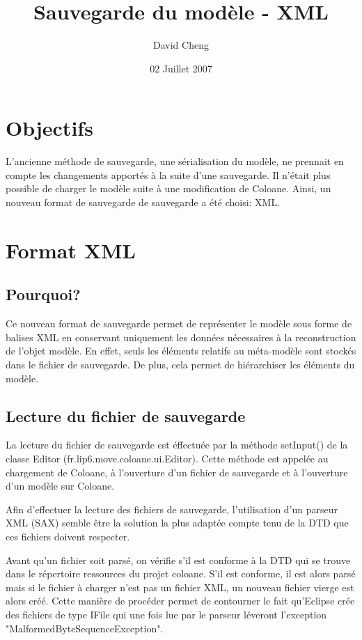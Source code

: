 \documentclass{article}
\title{Sauvegarde du mod\`ele - XML}
\author{David Cheng}
\date{02 Juillet 2007}
\begin{document}
\maketitle


\section{Objectifs}
L'ancienne m\'ethode de sauvegarde, une s\'erialisation du mod\`ele, ne prennait en compte les changements apport\'es \`a la suite d'une sauvegarde.
Il n'\'etait plus possible de charger le mod\`ele suite \`a une modification de Coloane.
Ainsi, un nouveau format de sauvegarde de sauvegarde a \'et\'e choisi: XML.
 
\section{Format XML}

\subsection{Pourquoi?}

Ce nouveau format de sauvegarde permet de repr\'esenter le mod\`ele sous forme de balises XML en conservant uniquement les donn\'ees n\'ecessaires \`a la reconstruction de l'objet mod\`ele.
En effet, seuls les \'el\'ements relatifs au m\'eta-mod\`ele sont stock\'es dans le fichier de sauvegarde.
De plus, cela permet de hi\'erarchiser les \'el\'ements du mod\`ele.
\subsection{Lecture du fichier de sauvegarde}
La lecture du fichier de sauvegarde est \'effectu\'ee par la m\'ethode setInput() de la classe Editor (fr.lip6.move.coloane.ui.Editor).
Cette m\'ethode est appel\'ee au chargement de Coloane, \`a l'ouverture d'un fichier de sauvegarde et \`a l'ouverture d'un mod\`ele sur Coloane.

Afin d'effectuer la lecture des fichiers de sauvegarde, l'utilisation d'un parseur XML (SAX) semble \^etre la solution la plus adapt\'ee compte tenu de la DTD que ces fichiers doivent respecter.

Avant qu'un fichier soit pars\'e, on v\'erifie s'il est conforme \`a la DTD qui se trouve dans le r\'epertoire ressources du projet coloane.
S'il est conforme, il est alors pars\'e mais si le fichier \`a charger n'est pas un fichier XML, un nouveau fichier vierge est alors cr\'e\'e. Cette mani\`ere de proc\'eder permet de contourner le fait qu'Eclipse cr\'ee des fichiers de type IFile qui une fois lue par le parseur l\'everont l'exception "MalformedByteSequenceException".
\end{document}
